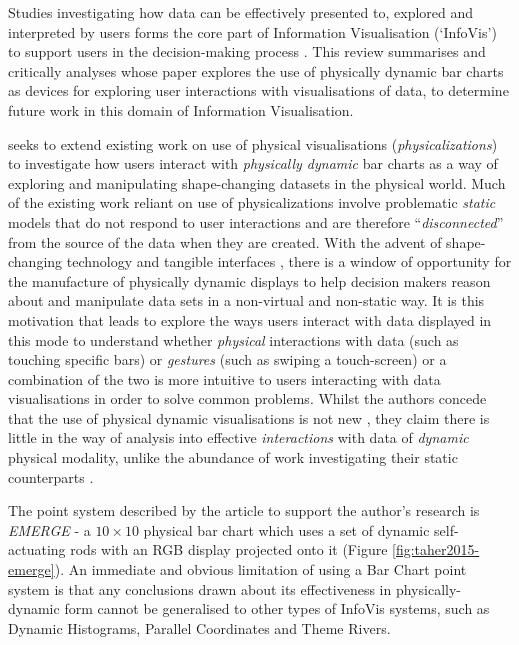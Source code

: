 \documentclass[11pt]{article}
\begin{document}

Studies investigating how data can be effectively presented to, explored and interpreted by users forms the core part of Information Visualisation (`InfoVis') to support users in the decision-making process \citep{card1997}. This review summarises and critically analyses \citet{taher2015} whose paper explores the use of physically dynamic bar charts as devices for exploring user interactions with visualisations of data, to determine future work in this domain of Information Visualisation.

\citeauthor{taher2015} seeks to extend existing work on use of physical visualisations (\textit{physicalizations}) \citep{jansen2015} to investigate how users interact with \textit{physically dynamic} bar charts as a way of exploring and manipulating shape-changing datasets in the physical world. Much of the existing work reliant on use of physicalizations involve problematic \textit{static} models that do not respond to user interactions \citep{jansen2013} and are therefore ``\textit{disconnected}'' from the source of the data when they are created. With the advent of shape-changing technology and tangible interfaces \citep{rasmussen2012}, there is a window of opportunity for the manufacture of physically dynamic displays to help decision makers reason about and manipulate data sets in a non-virtual and non-static way. It is this motivation that leads \citeauthor{taher2015} to explore the ways users interact with data displayed in this mode to understand whether \textit{physical} interactions with data (such as touching specific bars) or \textit{gestures} (such as swiping a touch-screen) or a combination of the two is more intuitive to users interacting with data visualisations in order to solve common problems. Whilst the authors concede that the use of physical dynamic visualisations is not new \citep{leithinger2010,follmer2013}, they claim there is little in the way of analysis into effective \textit{interactions} with data of \textit{dynamic} physical modality, unlike the abundance of work investigating their static counterparts \citep{stusak2014}.

The point system described by the article to support the author's research is \textit{EMERGE} - a $10\times10$ physical bar chart which uses a set of dynamic self-actuating rods with an RGB display projected onto it (Figure \ref{fig:taher2015-emerge}). An immediate and obvious limitation of using a Bar Chart point system is that any conclusions drawn about its effectiveness in physically-dynamic form cannot be generalised to other types of InfoVis systems, such as Dynamic Histograms, Parallel Coordinates and Theme Rivers. 
\end{document}
